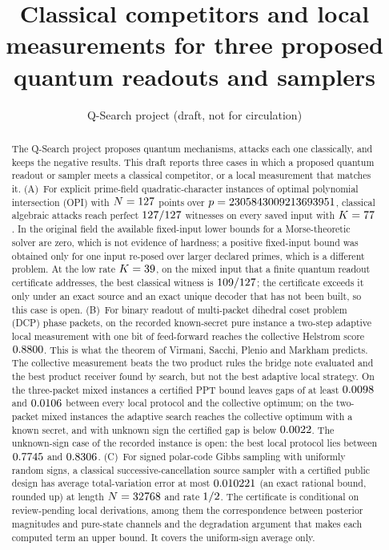 \documentclass[10pt]{article}
\title{Classical competitors and local measurements for three proposed quantum readouts and samplers}
\author{Q-Search project (draft, not for circulation)}
\date{}
\begin{document}
\maketitle

\begin{abstract}
The Q-Search project proposes quantum mechanisms, attacks each one classically, and keeps the negative results. This draft reports three cases in which a proposed quantum readout or sampler meets a classical competitor, or a local measurement that matches it.
(A)~For explicit prime-field quadratic-character instances of optimal polynomial intersection (OPI) with $N=127$ points over $p=2305843009213693951$, classical algebraic attacks reach perfect $127/127$ witnesses on every saved input with $K=77$. In the original field the available fixed-input lower bounds for a Morse-theoretic solver are zero, which is not evidence of hardness; a positive fixed-input bound was obtained only for one input re-posed over larger declared primes, which is a different problem. At the low rate $K=39$, on the mixed input that a finite quantum readout certificate addresses, the best classical witness is $109/127$; the certificate exceeds it only under an exact source and an exact unique decoder that has not been built, so this case is open.
(B)~For binary readout of multi-packet dihedral coset problem (DCP) phase packets, on the recorded known-secret pure instance a two-step adaptive local measurement with one bit of feed-forward reaches the collective Helstrom score $0.8800$. This is what the theorem of Virmani, Sacchi, Plenio and Markham predicts. The collective measurement beats the two product rules the bridge note evaluated and the best product receiver found by search, but not the best adaptive local strategy. On the three-packet mixed instances a certified PPT bound leaves gaps of at least $0.0098$ and $0.0106$ between every local protocol and the collective optimum; on the two-packet mixed instances the adaptive search reaches the collective optimum with a known secret, and with unknown sign the certified gap is below $0.0022$. The unknown-sign case of the recorded instance is open: the best local protocol lies between $0.7745$ and $0.8306$.
(C)~For signed polar-code Gibbs sampling with uniformly random signs, a classical successive-cancellation source sampler with a certified public design has average total-variation error at most $0.010221$ (an exact rational bound, rounded up) at length $N=32768$ and rate $1/2$. The certificate is conditional on review-pending local derivations, among them the correspondence between posterior magnitudes and pure-state channels and the degradation argument that makes each computed term an upper bound. It covers the uniform-sign average only.

\end{abstract}
\end{document}
